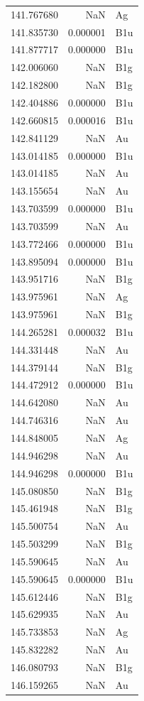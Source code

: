 \begin{longtable}{rrl}
141.767680 & NaN & Ag \\
141.835730 & 0.000001 & B1u \\
141.877717 & 0.000000 & B1u \\
142.006060 & NaN & B1g \\
142.182800 & NaN & B1g \\
142.404886 & 0.000000 & B1u \\
142.660815 & 0.000016 & B1u \\
142.841129 & NaN & Au \\
143.014185 & 0.000000 & B1u \\
143.014185 & NaN & Au \\
143.155654 & NaN & Au \\
143.703599 & 0.000000 & B1u \\
143.703599 & NaN & Au \\
143.772466 & 0.000000 & B1u \\
143.895094 & 0.000000 & B1u \\
143.951716 & NaN & B1g \\
143.975961 & NaN & Ag \\
143.975961 & NaN & B1g \\
144.265281 & 0.000032 & B1u \\
144.331448 & NaN & Au \\
144.379144 & NaN & B1g \\
144.472912 & 0.000000 & B1u \\
144.642080 & NaN & Au \\
144.746316 & NaN & Au \\
144.848005 & NaN & Ag \\
144.946298 & NaN & Au \\
144.946298 & 0.000000 & B1u \\
145.080850 & NaN & B1g \\
145.461948 & NaN & B1g \\
145.500754 & NaN & Au \\
145.503299 & NaN & B1g \\
145.590645 & NaN & Au \\
145.590645 & 0.000000 & B1u \\
145.612446 & NaN & B1g \\
145.629935 & NaN & Au \\
145.733853 & NaN & Ag \\
145.832282 & NaN & Au \\
146.080793 & NaN & B1g \\
146.159265 & NaN & Au \\

\end{longtable}
